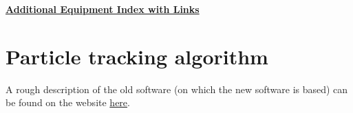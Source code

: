 \documentclass{../lab}
\begin{document}
\href{https://drive.google.com/file/d/1EVYdeQe_sQ-beBoFl7EtR7w2LG0T7Pp9/view?usp=drive_link}{\textbf{Additional Equipment Index with Links}}

\appendix

\section{Particle tracking algorithm}
\label{sec:particletrackingalgorithm}


A rough description of the old software (on which the new software is based) can be found on the website \href{https://berkeley-physics111b.github.io/appendices/BMC-Software/}{here}.
\end{document}
